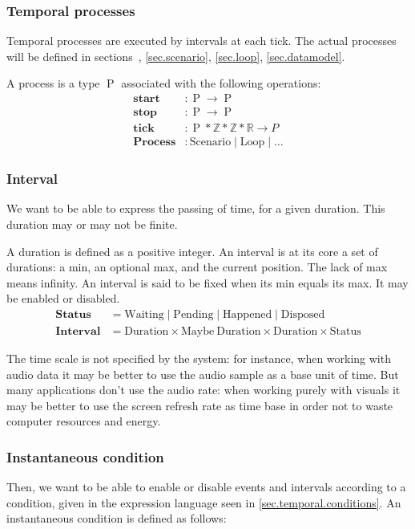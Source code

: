 \documentclass[applsci,article,submit,moreauthors,pdftex,10pt,a4paper]{mdpi}
\DeclareMathOperator{\proc}{P}
\begin{document}
\subsubsection{Temporal processes}
Temporal processes are executed by intervals at each tick. 
The actual processes will be defined in sections~, \ref{sec.scenario}, \ref{sec.loop}, \ref{sec.datamodel}.

A process is a type $\proc$ associated with the following operations: 
\begin{align*}
\mathbf{start}&: \proc \rightarrow \proc \\
\mathbf{stop}&: \proc \rightarrow \proc \\
\mathbf{tick}&: \proc * \mathbb{Z} * \mathbb{Z} * \mathbb{R} \rightarrow P\\
\mathbf{Process}&: \mathrm{Scenario} \mid \mathrm{Loop} \mid  \dots
\end{align*}
\subsubsection{Interval}
We want to be able to express the passing of time, for a given duration.
This duration may or may not be finite.

A duration is defined as a positive integer.
An interval is at its core a set of durations: a min, an optional max, and the current position. 
The lack of max means infinity.
An interval is said to be fixed when its min equals its max. It may be enabled or disabled.
\begin{align*}
\mathbf{Status} &= \mathrm{Waiting} \mid \mathrm{Pending} \mid \mathrm{Happened} \mid \mathrm{Disposed} \\
\mathbf{Interval} &= \mathrm{Duration} \times \mathrm{Maybe} ~\mathrm{Duration} \times \mathrm{Duration} \times \mathrm{Status}
\end{align*}

The time scale is not specified by the system: for instance, when working with audio data it may be better to use the audio sample as a base unit of time.
But many applications don't use the audio rate: when working purely with visuals it may be better to use the screen refresh rate as time base in order not to 
waste computer resources and energy. 

\subsubsection{Instantaneous condition}
Then, we want to be able to enable or disable events and intervals according to a condition, given in the expression language seen in \ref{sec.temporal.conditions}. An instantaneous condition is defined as follows: 
\end{document}
